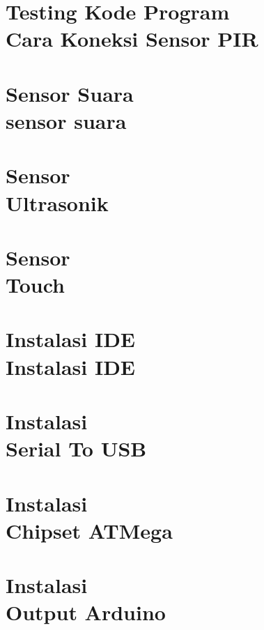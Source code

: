 \documentclass{WileySix}
\begin{document}
\chapter[Testing Kode Program]
{Testing Kode Program\\ Cara Koneksi Sensor PIR}


\chapter[Sensor Suara]
{Sensor Suara\\ sensor suara}


\chapter[Sensor Ultrasonik]
{Sensor\\ Ultrasonik}


\chapter[Sensor Sentuh]
{Sensor\\ Touch}


%

\chapter[Instalasi IDE]
{Instalasi IDE\\ Instalasi IDE}


\chapter[Serial To USB]
{Instalasi\\ Serial To USB}


\chapter[Jenis Chipset ATMega]
{Instalasi\\ Chipset ATMega}


\chapter[Perangkat Output Arduino]
{Instalasi\\ Output Arduino}






\printindex
\end{document}
